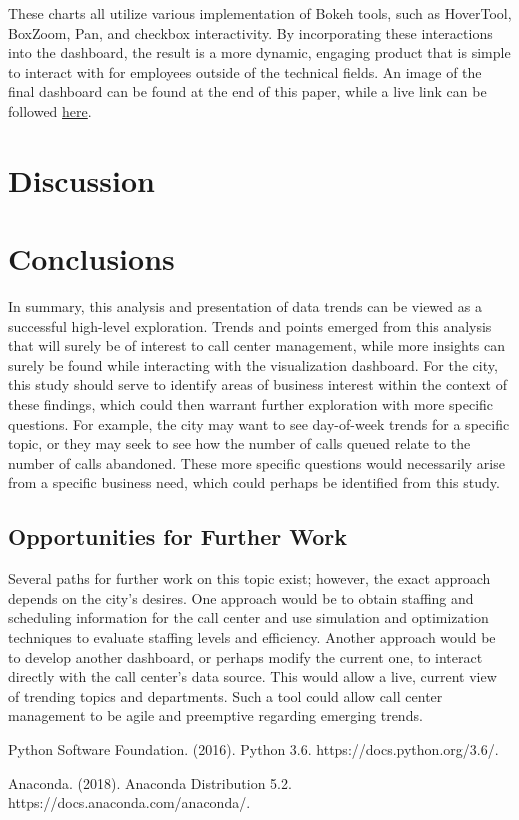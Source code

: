\documentclass[11pt,twocolumn]{article}
\begin{document}
These charts all utilize various implementation of Bokeh tools, such as HoverTool, BoxZoom, Pan, and checkbox interactivity.  By incorporating these interactions into the dashboard, the result is a more dynamic, engaging product that is simple to interact with for employees outside of the technical fields.  An image of the final dashboard can be found at the end of this paper, while a live link can be followed \href{https://jdbul33.github.io/311_Call_Dashboard.html}{here}.


\section{Discussion}


\section{Conclusions}

In summary, this analysis and presentation of data trends can be viewed as a successful high-level exploration.  Trends and points emerged from this analysis that will surely be of interest to call center management, while more insights can surely be found while interacting with the visualization dashboard.  For the city, this study should serve to identify areas of business interest within the context of these findings, which could then warrant further exploration with more specific questions.  For example, the city may want to see day-of-week trends for a specific topic, or they may seek to see how the number of calls queued relate to the number of calls abandoned.  These more specific questions would necessarily arise from a specific business need, which could perhaps be identified from this study.

	\subsection{Opportunities for Further Work}

Several paths for further work on this topic exist; however, the exact approach depends on the city's desires.  One approach would be to obtain staffing and scheduling information for the call center and use simulation and optimization techniques to evaluate staffing levels and efficiency.  Another approach would be to develop another dashboard, or perhaps modify the current one, to interact directly with the call center's data source.  This would allow a live, current view of trending topics and departments.  Such a tool could allow call center management to be agile and preemptive regarding emerging trends.



\begin{thebibliography}{9}
	
Python Software Foundation. (2016). Python 3.6. https://docs.python.org/3.6/.

Anaconda. (2018). Anaconda Distribution 5.2. https://docs.anaconda.com/anaconda/.


\end{thebibliography}
%
\end{document}
